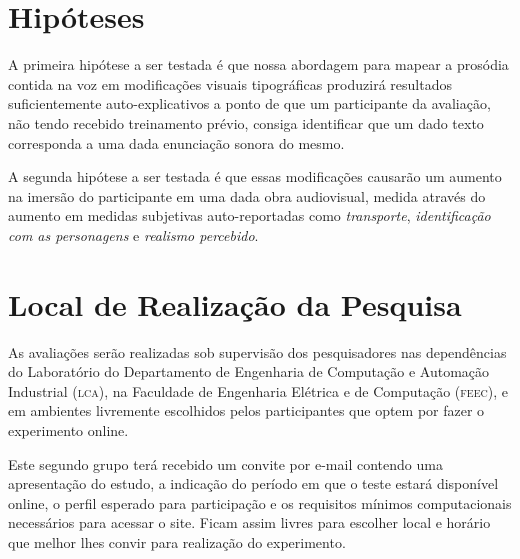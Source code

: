 \documentclass[a4paper,11pt,titlepage,singlespacing]{article}
\begin{document}


\section{Hipóteses}

\noindent A primeira hipótese a ser testada é que nossa abordagem para mapear a prosódia contida na voz em modificações visuais tipográficas produzirá resultados suficientemente auto-explicativos a ponto de que um participante da avaliação, não tendo recebido treinamento prévio, consiga identificar que um dado texto corresponda a uma dada enunciação sonora do mesmo.

A segunda hipótese a ser testada é que essas modificações causarão um aumento na imersão do participante em uma dada obra audiovisual, medida através do aumento em medidas subjetivas auto-reportadas como \textit{transporte}, \textit{identificação com as personagens} e \textit{realismo percebido}.

\section{Local de Realização da Pesquisa}

\noindent As avaliações serão realizadas sob supervisão dos pesquisadores nas dependências do Laboratório do Departamento de Engenharia de Computação e Automação Industrial (\textsc{lca}), na Faculdade de Engenharia Elétrica e de Computação (\textsc{feec}), e em ambientes livremente escolhidos pelos participantes que optem por fazer o experimento online. 

Este segundo grupo terá recebido um convite por e-mail contendo uma apresentação do estudo, a indicação do período em que o teste estará disponível online, o perfil esperado para participação e os requisitos mínimos computacionais necessários para acessar o site. Ficam assim livres para escolher local e horário que melhor lhes convir para realização do experimento.
\end{document}
